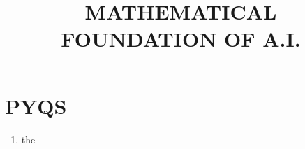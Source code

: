 \documentclass[12pt]{article}
\begin{document}
	\title{\LARGE{MATHEMATICAL FOUNDATION OF A.I.}}
	\maketitle
	
	
	\newpage
	
	\section{\LARGE{PYQS}}
	
	\begin{enumerate}
		\subsection{1-marks questions}
		
		
		\subsection{2-marks questions}
		
		
		\subsection{3-marks questions}
		
		
		\subsection{4-marks questions}

		
		
		
		
		\subsection{5-marks questions}
		
		
		
		\subsection{10-marks questions}
		
		
		\section{20-marks questions}
		\item the
		
	\end{enumerate}
\end{document}
